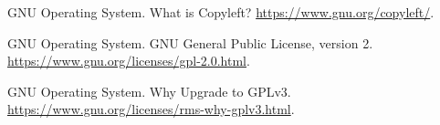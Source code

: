 \documentclass[12pt,letterpaper]{article}
\begin{document}
\newpage

\begin{thebibliography}{9}
 GNU Operating System. What is Copyleft? \url{https://www.gnu.org/copyleft/}.

 GNU Operating System. GNU General Public License, version 2. \url{https://www.gnu.org/licenses/gpl-2.0.html}.

 GNU Operating System. Why Upgrade to GPLv3. \url{https://www.gnu.org/licenses/rms-why-gplv3.html}.

\end{thebibliography}





\end{document}
